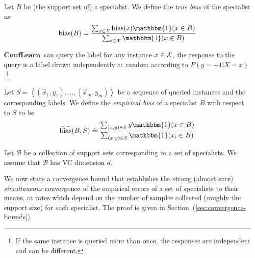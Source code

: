 \documentclass{article}
\newcommand{\x}{\vec{x}}
\newcommand{\ones}{\mathbbm{1}}
\newcommand{\cB}{\mathcal{B}}
\newcommand{\bias}{\text{bias}}
\newcommand{\ebias}{\widehat{\text{bias}}}
\newcommand{\ActiveLearn}{\mathbf{ConfLearn}}
\newcommand{\universe}[1]{{\cal #1}}
\newcommand{\samp}{S}
\begin{document}
Let $B$ be (the support set of) a specialist. We define the {\em true
  bias} of the specialist as:
\[
\bias(B) \doteq
\frac{\sum_{x \in \universe{X}} \bias(x) \ones(x \in B)}
{\sum_{x \in \universe{X}} \ones(x \in B)}
\]

$\ActiveLearn$\ can query the label for any instance $x \in \universe{X}$, the
response to the query is a label drawn independently at random
according to $P(y=+1 | X=x)$.\footnote{If the same instance is queried
  more than once, the responses are independent and can be different.}

Let $\samp= \left\langle (\x_1,y_1),\ldots,(\x_m,y_m) \right\rangle$ be a sequence
of queried instances and the corresponding labels. We define the {\em
  empirical bias} of a specialist $B$ with respect to $\samp$ to be 
\[
\ebias(B,\samp) \doteq
\frac{\sum_{(x,y) \in \samp} y \ones(x \in B)}{ \sum_{(x,y) \in \samp} \ones(x_i \in B)}
\]

\iffalse
When learning using standard classifiers (to which we refer here as
{\em generalists} the learning algorithm typically searches for the
``empirical risk minimizer'' or ERM. The role of generalization bounds
is to show that the generalization error of the ERM is not much larger
than the training error. In contrast, when learning using specialists,
the rule that is output is not the ERM, instead, it is a rule that is
a combination of many specialists. The specialists will typically have
small (low probability) support. The combined classifier will have a
higher probability of a non-zero prediction, but it might still
abstain on a significant part of the space where the conditional
probability of a $+1$ label is close to $1/2$. In this work 	
we calculate convergence bounds {\em inside the
  learning algorithm}, this is similar to work on ``self-bounding
algorithms''.

The algorithm uses the bounds to compute confidence
intervals on $\bias(B)$ the probability of the label $+1$
conditioned on the instance $x$ being in the support set $B$.
\fi


Let $\cB$ be a collection of support sets corresponding to a set of
specialists. We assume that $\cB$ has VC dimension $d$. 

We now state a convergence bound that establishes the strong (almost sure) \emph{simultaneous} convergence 
of the empirical errors of a set of specialists to their means, 
at rates which depend on the number of samples collected (roughly the support size) for each specialist.
The proof is given in Section~(\ref{sec:convergence-bounds}).
\end{document}
